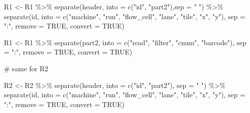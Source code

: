 \documentclass[
  letterpaper,
  DIV=11,
  numbers=noendperiod]{scrreprt}
\newenvironment{Shaded}{}{}
\newcommand{\AttributeTok}[1]{\textcolor[rgb]{0.84,0.23,0.29}{#1}}
\newcommand{\CommentTok}[1]{\textcolor[rgb]{0.42,0.45,0.49}{#1}}
\newcommand{\ConstantTok}[1]{\textcolor[rgb]{0.00,0.36,0.77}{#1}}
\newcommand{\FunctionTok}[1]{\textcolor[rgb]{0.44,0.26,0.76}{#1}}
\newcommand{\NormalTok}[1]{\textcolor[rgb]{0.14,0.16,0.18}{#1}}
\newcommand{\OtherTok}[1]{\textcolor[rgb]{0.44,0.26,0.76}{#1}}
\newcommand{\SpecialCharTok}[1]{\textcolor[rgb]{0.00,0.36,0.77}{#1}}
\newcommand{\StringTok}[1]{\textcolor[rgb]{0.01,0.18,0.38}{#1}}
\begin{document}
\begin{tcolorbox}[enhanced jigsaw, arc=.35mm, left=2mm, titlerule=0mm, rightrule=.15mm, colframe=quarto-callout-tip-color-frame, coltitle=black, colback=white, opacityback=0, bottomtitle=1mm, bottomrule=.15mm, colbacktitle=quarto-callout-tip-color!10!white, breakable, title=\textcolor{quarto-callout-tip-color}{\faLightbulb}\hspace{0.5em}{Code and answer}, toptitle=1mm, toprule=.15mm, opacitybacktitle=0.6, leftrule=.75mm]

\begin{Shaded}
\begin{Highlighting}[]
\NormalTok{R1 }\OtherTok{\textless{}{-}}\NormalTok{ R1 }\SpecialCharTok{\%\textgreater{}\%} \FunctionTok{separate}\NormalTok{(header, }\AttributeTok{into =} \FunctionTok{c}\NormalTok{(}\StringTok{"id"}\NormalTok{, }\StringTok{"part2"}\NormalTok{),}\AttributeTok{sep =} \StringTok{" "}\NormalTok{) }\SpecialCharTok{\%\textgreater{}\%}
  \FunctionTok{separate}\NormalTok{(id,}
           \AttributeTok{into =} \FunctionTok{c}\NormalTok{(}\StringTok{"machine"}\NormalTok{, }\StringTok{"run"}\NormalTok{, }\StringTok{"flow\_cell"}\NormalTok{, }\StringTok{"lane"}\NormalTok{, }\StringTok{"tile"}\NormalTok{, }\StringTok{"x"}\NormalTok{, }\StringTok{"y"}\NormalTok{), }
           \AttributeTok{sep =} \StringTok{":"}\NormalTok{,}
           \AttributeTok{remove =} \ConstantTok{TRUE}\NormalTok{, }\AttributeTok{convert =} \ConstantTok{TRUE}\NormalTok{)}

\NormalTok{R1 }\OtherTok{\textless{}{-}}\NormalTok{ R1 }\SpecialCharTok{\%\textgreater{}\%} \FunctionTok{separate}\NormalTok{(part2,}
                      \AttributeTok{into =} \FunctionTok{c}\NormalTok{(}\StringTok{"read"}\NormalTok{, }\StringTok{"filter"}\NormalTok{, }\StringTok{"cnum"}\NormalTok{, }\StringTok{"barcode"}\NormalTok{),}
                      \AttributeTok{sep =} \StringTok{":"}\NormalTok{,}
                      \AttributeTok{remove =} \ConstantTok{TRUE}\NormalTok{, }\AttributeTok{convert =} \ConstantTok{TRUE}\NormalTok{)}

\CommentTok{\# same for R2}

\NormalTok{R2 }\OtherTok{\textless{}{-}}\NormalTok{ R2 }\SpecialCharTok{\%\textgreater{}\%} \FunctionTok{separate}\NormalTok{(header, }\AttributeTok{into =} \FunctionTok{c}\NormalTok{(}\StringTok{"id"}\NormalTok{, }\StringTok{"part2"}\NormalTok{), }\AttributeTok{sep =} \StringTok{" "}\NormalTok{) }\SpecialCharTok{\%\textgreater{}\%}
    \FunctionTok{separate}\NormalTok{(id, }
             \AttributeTok{into =} \FunctionTok{c}\NormalTok{(}\StringTok{"machine"}\NormalTok{, }\StringTok{"run"}\NormalTok{, }\StringTok{"flow\_cell"}\NormalTok{, }\StringTok{"lane"}\NormalTok{, }\StringTok{"tile"}\NormalTok{, }\StringTok{"x"}\NormalTok{, }\StringTok{"y"}\NormalTok{), }
             \AttributeTok{sep =} \StringTok{":"}\NormalTok{,}
             \AttributeTok{remove =} \ConstantTok{TRUE}\NormalTok{, }\AttributeTok{convert =} \ConstantTok{TRUE}\NormalTok{)}


\end{Highlighting}
\end{Shaded}
\end{tcolorbox}
\end{document}
